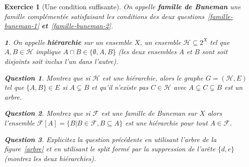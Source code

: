 \documentclass{article}
\theoremstyle{exostyle}
\newtheorem{exo}{Exercice}
\theoremstyle{partiestyle}
\newtheorem{partie}{}[exo]
\theoremstyle{questionstyle}
\newtheorem{questionpartie}{Question}[partie]
\begin{document}
\begin{exo}[Une condition suffisante]
	On appelle {\bf\em famille de Buneman} une famille complémentée satisfaisant les conditions des deux questions~\ref{famille-buneman-1} {\bf et}~\ref{famille-buneman-2}.
	\begin{partie}
		\label{hierarchie}
		On appelle {\em \bf hiérarchie} sur un ensemble $X$, un ensemble $\mathcal{H} \subseteq 2^X$ tel que $A, B \in \mathcal{H}$ implique $A \cap B \in \{\emptyset, A, B \}$ (les deux ensembles $A$ et $B$ sont soit disjoints soit inclus l'un dans l'autre).
		\begin{questionpartie}
			Montrez que si $\mathcal{H}$ est une hiérarchie, alors le graphe $G = (\mathcal{H}, E)$ tel que $\{A, B\} \in E$ si $A \subsetneq B$ et qu'il n'existe pas $C \in \mathcal{H}$ avec $A \subsetneq C \subsetneq B$ est un arbre.
		\end{questionpartie}
		\begin{questionpartie}
			Montrez que si $\mathcal{F}$ est une famille de Buneman sur $X$ alors l'ensemble $\mathcal{F}[A] = \{ B \vert B \in \mathcal{F}, B \subseteq A \}$ est une hiérarchie pour tout $A\in \mathcal{F}$.
		\end{questionpartie}
		\begin{questionpartie}
			Explicitez la question précédente en utilisant l'arbre de la figure~\ref{arbre} et en utilisant le split formé par la suppression de l'arête $\{d, e\}$ (montrez les deux hiérarchies).
		\end{questionpartie}


\end{partie}
\end{exo}
\end{document}
